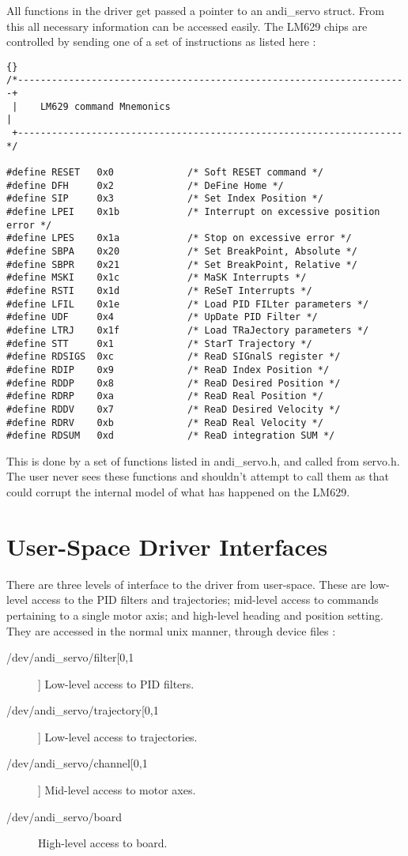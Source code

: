 \documentclass[a4paper,11pt]{article}
\begin{document}
All functions in the driver get passed a pointer to an andi\_servo
struct. From this all necessary information can be accessed easily. 
The LM629 chips are controlled by sending one of a set of instructions
as listed here :

\begin{lstlisting}{}
/*---------------------------------------------------------------------+
 |    LM629 command Mnemonics                                          |
 +--------------------------------------------------------------------*/

#define RESET   0x0				/* Soft RESET command */
#define DFH     0x2				/* DeFine Home */
#define SIP     0x3				/* Set Index Position */
#define LPEI    0x1b			/* Interrupt on excessive position error */
#define LPES    0x1a			/* Stop on excessive error */
#define SBPA    0x20			/* Set BreakPoint, Absolute */
#define SBPR    0x21			/* Set BreakPoint, Relative */
#define MSKI    0x1c			/* MaSK Interrupts */
#define RSTI    0x1d			/* ReSeT Interrupts */
#define LFIL    0x1e			/* Load PID FILter parameters */
#define UDF     0x4				/* UpDate PID Filter */
#define LTRJ    0x1f			/* Load TRaJectory parameters */
#define STT		0x1				/* StarT Trajectory */
#define RDSIGS  0xc				/* ReaD SIGnalS register */
#define RDIP    0x9				/* ReaD Index Position */
#define RDDP    0x8				/* ReaD Desired Position */
#define RDRP    0xa				/* ReaD Real Position */
#define RDDV    0x7				/* ReaD Desired Velocity */
#define RDRV    0xb				/* ReaD Real Velocity */
#define RDSUM   0xd				/* ReaD integration SUM */
\end{lstlisting}

This is done by a set of functions listed in andi\_servo.h, and called
from servo.h. The user never sees these functions and shouldn't attempt
to call them as that could corrupt the internal model of what has
happened on the LM629. 

\part{User-Space Driver Interfaces}

There are three levels of interface to the driver from user-space. These
are low-level access to the PID filters and trajectories; mid-level
access to commands pertaining to a single motor axis; and 
high-level heading and position setting. They are accessed in the
normal unix manner, through device files :
\small
\begin{description}
\item[/dev/andi\_servo/filter[0,1]]
Low-level access to PID filters.
\item[/dev/andi\_servo/trajectory[0,1]]
Low-level access to trajectories.
\item[/dev/andi\_servo/channel[0,1]]
Mid-level access to motor axes.
\item[/dev/andi\_servo/board]
High-level access to board.
\end{description}
\normalsize
\end{document}
